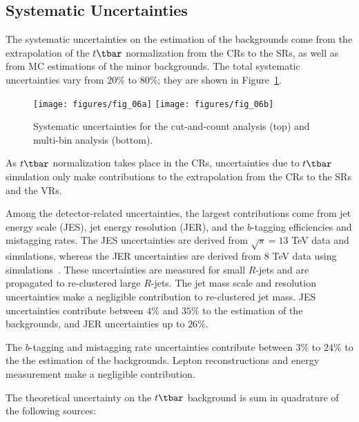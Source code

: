 \subsection{Systematic Uncertainties}\label{mb:sysun}

The systematic uncertainties on the estimation of the backgrounds come from the
extrapolation of the $t\tbar$ normalization from the CRs to the SRs, as well as
from MC estimations of the minor backgrounds. The total systematic
uncertainties vary from $20\%$ to $80\%$; they are shown in
Figure~\ref{f:fig_06}.

\begin{figure}[H]
	\texttt{[image: figures/fig\_06a]}
	\texttt{[image: figures/fig\_06b]}
	\centering
	\caption{Systematic uncertainties for the cut-and-count analysis (top) and multi-bin
		analysis (bottom).}
	\label{f:fig_06}
\end{figure}

As $t\tbar$ normalization takes place in the CRs, uncertainties due to $t\tbar$
simulation only make contributions to the extrapolation from the CRs to the SRs
and the VRs. 

Among the detector-related uncertainties, the largest contributions come from
jet energy scale (JES), jet energy resolution (JER), and the $b$-tagging
efficiencies and mistagging rates. The JES uncertainties are derived from
$\sqrt{s}=13$ TeV data and simulations, whereas the JER uncertainties are
derived from $8$ TeV data using simulations~\cite{ATL-PHYS-PUB-2015-015}. These
uncertainties are measured for small $R$-jets and are propagated to
re-clustered large $R$-jets. The jet mass scale and resolution uncertainties
make a negligible contribution to re-clustered jet mass. JES uncertainties
contribute between $4\%$ and $35\%$ to the estimation of the backgrounds, and
JER uncertainties up to $26\%$.

The $b$-tagging and mistagging rate uncertainties contribute between $3\%$ to
$24\%$ to the the estimation of the backgrounds. Lepton reconstructions and
energy measurement make a negligible contribution.

The theoretical uncertainty on the $t\tbar$ background is sum in
quadrature of the following sources:

